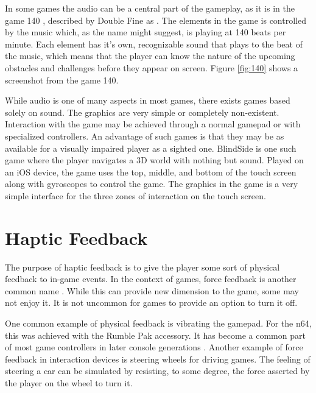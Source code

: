In some games the audio can be a central part of the gameplay, as it is in the game 140 \cite{140game}, described by Double Fine as
.
The elements in the game is controlled by the music which, as the name might suggest, is playing at 140 beats per minute.
Each element has it's own, recognizable sound that plays to the beat of the music, which means that the player can know the nature of the upcoming obstacles and challenges before they appear on screen.
Figure \ref{fig:140} shows a screenshot from the game 140.

While audio is one of many aspects in most games, there exists games based solely on sound.
The graphics are very simple or completely non-existent.
Interaction with the game may be achieved through a normal gamepad or with specialized controllers.
An advantage of such games is that they may be as available for a visually impaired player as a sighted one.
BlindSide \cite{blindside} is one such game where the player navigates a 3D world with nothing but sound.
Played on an iOS device, the game uses the top, middle, and bottom of the touch screen along with gyroscopes to control the game.
The graphics in the game is a very simple interface for the three zones of interaction on the touch screen.

\section{Haptic Feedback}
\label{immersionHaptic}
The purpose of haptic feedback is to give the player some sort of physical feedback to in-game events.
In the context of games, force feedback is another common name \cite{cummings2007evolution}.
While this can provide new dimension to the game, some may not enjoy it.
It is not uncommon for games to provide an option to turn it off.

One common example of physical feedback is vibrating the gamepad.
For the \gls{n64}, this was achieved with the Rumble Pak accessory.
It has become a common part of most game controllers in later console generations \cite{cummings2007evolution}.
Another example of force feedback in interaction devices is steering wheels for driving games.
The feeling of steering a car can be simulated by resisting, to some degree, the force asserted by the player on the wheel to turn it.


